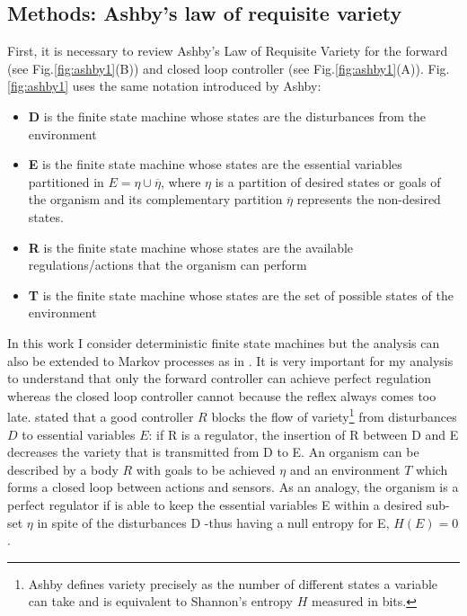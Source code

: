\subsection{Methods: Ashby's law of requisite variety}
First, it is necessary to review Ashby's Law of Requisite Variety for the forward
(see Fig.\ref{fig:ashby1}(B)) and closed loop controller (see Fig.\ref{fig:ashby1}(A)).
Fig.\ref{fig:ashby1} uses the same notation introduced by Ashby:
\begin{itemize}
 \item \textbf{D} is the finite state machine whose states are the disturbances from the environment
 \item \textbf{E} is the finite state machine whose states are the essential variables partitioned
in $E= \eta \cup \overline{\eta}$, where $\eta$ is a partition of desired states or
 goals of the organism and its complementary partition $\overline{\eta}$ represents
 the non-desired states.
 \item \textbf{R} is the finite state machine whose states are the available regulations/actions that the organism can perform
 \item \textbf{T} is the finite state machine whose states are the set of possible states of the environment
\end{itemize}
In this work I consider deterministic finite state machines but the analysis
can also be extended to Markov processes as in \citet{FSMbook}. It is very important
for my analysis to understand that only the forward controller can achieve
perfect regulation whereas the closed loop controller cannot because the reflex
always comes too late.
\citet{Ashby1956:IntroCybernetics} stated that a good controller $R$ blocks
 the flow of variety\footnote{Ashby defines variety precisely as the number
of different states a variable can take and is equivalent to Shannon's
entropy $H$ measured in bits.} from disturbances $D$ to essential variables
 $E$: if R is a regulator, the insertion of R between D and E decreases the
 variety that is transmitted from D to E.
An organism can be described by a body $R$ with goals to be achieved $\eta$
 and an environment $T$ which forms a closed loop between actions and sensors.
As an analogy, the organism is a perfect regulator if is able to keep
 the essential variables E within a desired sub-set $\eta$ in spite of the
disturbances D -thus having a null entropy for E, $H(E)=0$.

